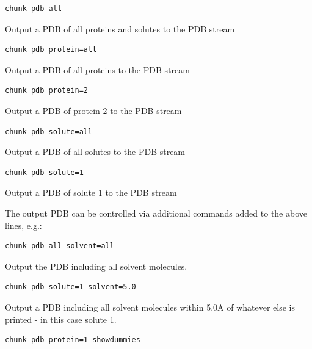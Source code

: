 \documentclass[letterpaper,10pt,english]{sphinxmanual}
\begin{document}
\begin{Verbatim}[frame=single,commandchars=\\\{\}]
chunk pdb all
\end{Verbatim}

Output a PDB of all proteins and solutes to the PDB stream

\begin{Verbatim}[frame=single,commandchars=\\\{\}]
chunk pdb protein=all
\end{Verbatim}

Output a PDB of all proteins to the PDB stream

\begin{Verbatim}[frame=single,commandchars=\\\{\}]
chunk pdb protein=2
\end{Verbatim}

Output a PDB of protein 2 to the PDB stream

\begin{Verbatim}[frame=single,commandchars=\\\{\}]
chunk pdb solute=all
\end{Verbatim}

Output a PDB of all solutes to the PDB stream

\begin{Verbatim}[frame=single,commandchars=\\\{\}]
chunk pdb solute=1
\end{Verbatim}

Output a PDB of solute 1 to the PDB stream

The output PDB can be controlled via additional commands added to the above lines, e.g.:

\begin{Verbatim}[frame=single,commandchars=\\\{\}]
chunk pdb all solvent=all
\end{Verbatim}

Output the PDB including all solvent molecules.

\begin{Verbatim}[frame=single,commandchars=\\\{\}]
chunk pdb solute=1 solvent=5.0
\end{Verbatim}

Output a PDB including all solvent molecules within 5.0A of whatever else is printed - in this case solute 1.

\begin{Verbatim}[frame=single,commandchars=\\\{\}]
chunk pdb protein=1 showdummies
\end{Verbatim}
\end{document}

